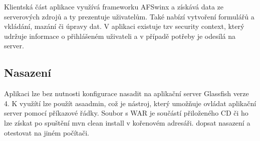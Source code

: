 Klientská část aplikace využívá frameworku AFSwinx a získává data ze serverových zdrojů a ty prezentuje uživatelům. Také nabízí vytvoření formulářů a vkládání, mazání či úpravy dat. V aplikaci existuje tzv security context, který udržuje informace o přihlášeném uživateli a v případě potřeby je odesílá na server. 

\subsection{Nasazení}
Aplikaci lze bez nutnosti konfigurace nasadit na aplikační server Glassfish verze 4. K využítí lze použít asaadmin, což je nástroj, který umožňuje ovládat aplikační server pomocí příkazové řádky. Soubor s WAR je součástí přiloženého CD či ho lze získat po spuštění mvn clean install v kořenovém adresáři. dopsat nasazení a otestovat na jiném počítači.